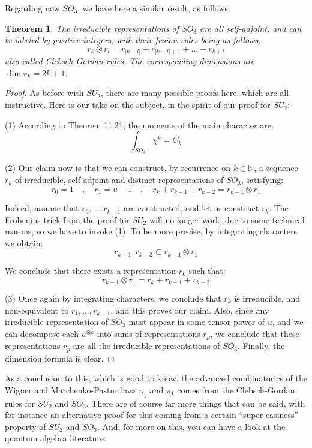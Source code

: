 \documentclass[12pt]{amsbook}
\newtheorem{theorem}{Theorem}[chapter]
\begin{document}
Regarding now $SO_3$, we have here a similar result, as follows:

\begin{theorem}
The irreducible representations of $SO_3$ are all self-adjoint, and can be labeled by positive integers, with their fusion rules being as follows,
$$r_k\otimes r_l=r_{|k-l|}+r_{|k-l|+1}+\ldots+r_{k+l}$$ 
also called Clebsch-Gordan rules. The corresponding dimensions are $\dim r_k=2k+1$.
\end{theorem}

\begin{proof}
As before with $SU_2$, there are many possible proofs here, which are all instructive. Here is our take on the subject, in the spirit of our proof for $SU_2$:

\medskip

(1) According to Theorem 11.21, the moments of the main character are:
$$\int_{SO_3}\chi^k=C_k$$

(2) Our claim now is that we can construct, by recurrence on $k\in\mathbb N$, a sequence $r_k$ of irreducible, self-adjoint and distinct representations of $SO_3$, satisfying:
$$r_0=1\quad,\quad
r_1=u-1\quad,\quad 
r_k+r_{k-1}+r_{k-2}=r_{k-1}\otimes r_1$$

Indeed, assume that $r_0,\ldots,r_{k-1}$ are constructed, and let us construct $r_k$. The Frobenius trick from the proof for $SU_2$ will no longer work, due to some technical reasons, so we have to invoke (1). To be more precise, by integrating characters we obtain:
$$r_{k-1},r_{k-2}\subset r_{k-1}\otimes r_1$$

We conclude that there exists a representation $r_k$ such that:
$$r_{k-1}\otimes r_1=r_k+r_{k-1}+r_{k-2}$$

(3) Once again by integrating characters, we conclude that $r_k$ is irreducible, and non-equivalent to $r_1,\ldots,r_{k-1}$, and this proves our claim. Also, since any irreducible representation of $SO_3$ must appear in some tensor power of $u$, and we can decompose each $u^{\otimes k}$ into sums of representations $r_p$, we conclude that these representations $r_p$ are all the irreducible representations of $SO_3$. Finally, the dimension formula is clear.
\end{proof}

As a conclusion to this, which is good to know, the advanced combinatorics of the Wigner and Marchenko-Pastur laws $\gamma_1$ and $\pi_1$ comes from the Clebsch-Gordan rules for $SU_2$ and $SO_3$. There are of course far more things that can be said, with for instance an alternative proof for this coming from a certain ``super-easiness'' property of $SU_2$ and $SO_3$. And, for more on this, you can have a look at the quantum algebra literature.
\end{document}
